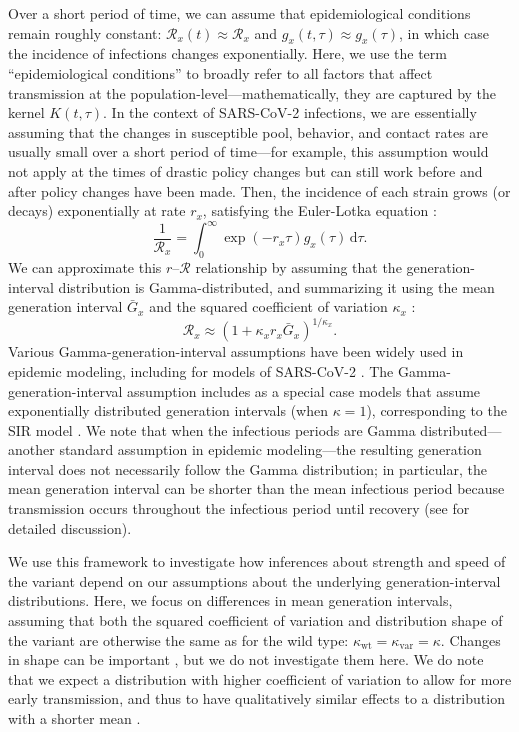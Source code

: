 \documentclass[12pt]{article}
\newcommand{\RR}{\ensuremath{{\mathcal R}}\xspace}
\newcommand{\dd}[1]{\ensuremath{\, \mathrm{d}#1}}
\newcommand{\dtau}{\dd{\tau}}
\begin{document}
Over a short period of time, we can assume that epidemiological conditions remain roughly constant: $\RR_x(t) \approx \RR_x$ and $g_x(t, \tau) \approx g_x(\tau)$, in which case the incidence of infections changes exponentially.
Here, we use the term ``epidemiological conditions'' to broadly refer to all factors that affect transmission at the population-level---mathematically, they are captured by the kernel $K(t, \tau)$.
In the context of SARS-CoV-2 infections, we are essentially assuming that the changes in susceptible pool, behavior, and contact rates are usually small over a short period of time---for example, this assumption would not apply at the times of drastic policy changes but can still work before and after policy changes have been made.
Then, the incidence of each strain grows (or decays) exponentially at rate $r_x$, satisfying the Euler-Lotka equation \citep{wallinga2007generation}:
\begin{equation}
\frac{1}{\RR_x} = \int_0^\infty \exp(- r_x \tau) g_x(\tau) \dtau.
\end{equation}
We can approximate this $r$--$\RR$ relationship by assuming that the generation-interval distribution is Gamma-distributed, and summarizing it using the mean generation interval $\bar{G}_x$ and the squared coefficient of variation $\kappa_x$ \citep{park2019practical}:
\begin{equation}
\RR_x \approx (1 + \kappa_x r_x \bar{G}_x)^{1/\kappa_x}.
\end{equation}
Various Gamma-generation-interval assumptions have been widely used in epidemic modeling, including for models of SARS-CoV-2 \citep{doi:10.1098/rsif.2020.0144}.
The Gamma-generation-interval assumption includes as a special case models that assume exponentially distributed generation intervals (when $\kappa=1$), corresponding to the SIR model \citep{anderson1991infectious}.
We note that when the infectious periods are Gamma distributed---another standard assumption in epidemic modeling---the resulting generation interval does not necessarily follow the Gamma distribution;
in particular, the mean generation interval can be shorter than the mean infectious period because transmission occurs throughout the infectious period until recovery (see \cite{roberts2007model} for detailed discussion).

We use this framework to investigate how inferences about strength and speed of the variant depend on our assumptions about the underlying generation-interval distributions.
Here, we focus on differences in mean generation intervals, assuming that both the squared coefficient of variation and distribution shape of the variant are otherwise the same as for the wild type: $\kappa_{\mathrm{wt}} = \kappa_{\mathrm{var}} = \kappa$.
Changes in shape can be important \citep{miller2010epidemics,svensson2015influence}, but we do not investigate them here. 
We do note that we expect a distribution with higher coefficient of variation to allow for more early transmission, and thus to have qualitatively similar effects to a distribution with a shorter mean \citep{park2019practical}.
\end{document}
